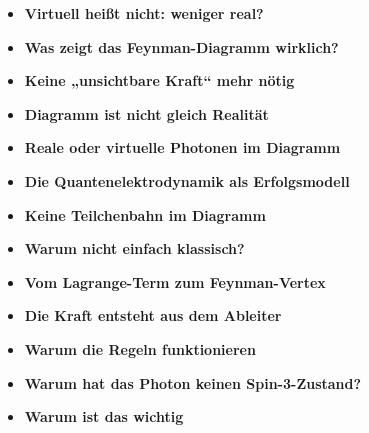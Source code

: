 \vspace{1em}
\begin{tcolorbox}[title=didaktische Boxen, didaktikbox]
	\begin{itemize}
		\item \textbf{Virtuell heißt nicht: weniger real?} \dotfill \pageref{box:virtuell-denkfehler}
		\item \textbf{Was zeigt das Feynman-Diagramm wirklich?} \dotfill \pageref{box:Was zeigt das Feynman-Diagramm wirklich}
			\item \textbf{Keine „unsichtbare Kraft“ mehr nötig} \dotfill \pageref{box:unsichtbare Kraft}
		\item \textbf{Diagramm ist nicht gleich Realität} \dotfill \pageref{boxx:Diagramm ist nicht gleich realität}
		\item \textbf{Reale oder virtuelle Photonen \newline im Diagramm} \dotfill \pageref{box:Reale oder virtuelle Photonen}
		\item \textbf{Die Quantenelektrodynamik \newline als Erfolgsmodell} \dotfill \pageref{box:Die Quantenelekrodynamik}
		
		
		\item \textbf{Keine Teilchenbahn im Diagramm} \dotfill \pageref{box: Keine Teilchenbahn im Diagramm}
		
		\item \textbf{Warum nicht einfach klassisch?} \dotfill \pageref{box:Warum nicht einfach klassisch?}
		\item \textbf{Vom Lagrange-Term zum Feynman-Vertex} \dotfill \pageref{box:Vom Lagrange-Term zum Feynmann-Vertax}
		
		\item \textbf{Die Kraft entsteht aus dem Ableiter} \dotfill \pageref{box:Die Kraft entsteht aus dem Ableiter}
		\item \textbf{Warum die Regeln funktionieren} \dotfill \pageref{box:Warum die Regeln funktionieren}
		
		\item \textbf{Warum hat das Photon keinen \newline Spin-3-Zustand?} \dotfill \pageref{box:Warum hat das Photon keinen  Spin-3-Zustand}
        	\item \textbf{Warum ist das wichtig} \dotfill \pageref{box:Warum ist wichtig}
	\end{itemize}
\end{tcolorbox}

